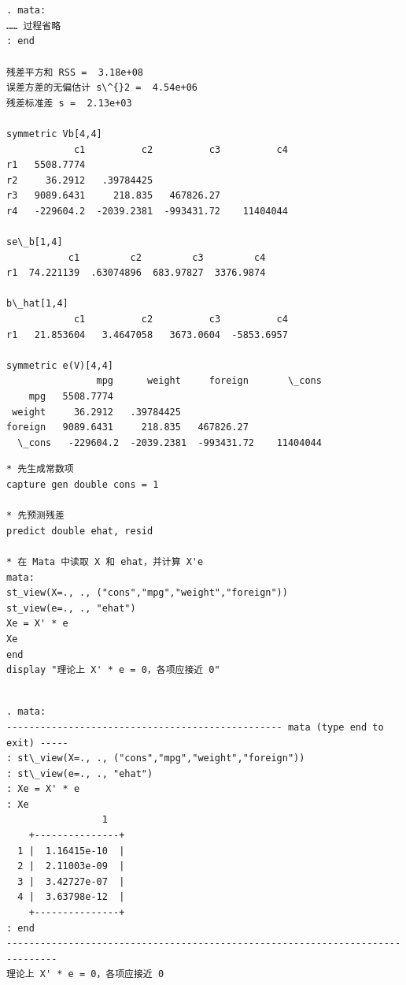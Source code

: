 \begin{tcolorbox}[title=在 Stata 的 Mata 中计算残差、SSR、$s^2$ 与协方差矩阵、标准误, colback=white, colframe=black, colbacktitle=white, coltitle=black,fonttitle=\bfseries]
	\vspace{-2em}

	\begin{Verbatim}[commandchars=\\\{\},xleftmargin=2em]


. mata:
…… 过程省略
: end

残差平方和 RSS =  3.18e+08
误差方差的无偏估计 s\^{}2 =  4.54e+06
残差标准差 s =  2.13e+03

symmetric Vb[4,4]
            c1          c2          c3          c4
r1   5508.7774
r2     36.2912   .39784425
r3   9089.6431     218.835   467826.27
r4   -229604.2  -2039.2381  -993431.72    11404044

se\_b[1,4]
           c1         c2         c3         c4
r1  74.221139  .63074896  683.97827  3376.9874

b\_hat[1,4]
            c1          c2          c3          c4
r1   21.853604   3.4647058   3673.0604  -5853.6957

symmetric e(V)[4,4]
                mpg      weight     foreign       \_cons
    mpg   5508.7774
 weight     36.2912   .39784425
foreign   9089.6431     218.835   467826.27
  \_cons   -229604.2  -2039.2381  -993431.72    11404044
	\end{Verbatim}

\end{tcolorbox}

\begin{tcolorbox}[title=在 Stata 的 Mata 中验证（残差与解释变量正交）, colback=white, colframe=black, colbacktitle=white, coltitle=black, fonttitle=\bfseries]
	\begin{lstlisting}[xleftmargin=2em, commentstyle=\color{black}]
* 先生成常数项
capture gen double cons = 1

* 先预测残差
predict double ehat, resid

* 在 Mata 中读取 X 和 ehat，并计算 X'e
mata:
st_view(X=., ., ("cons","mpg","weight","foreign"))
st_view(e=., ., "ehat")
Xe = X' * e
Xe
end
display "理论上 X' * e = 0，各项应接近 0"
	\end{lstlisting}
	\vspace{-2em}
	\begin{Verbatim}[commandchars=\\\{\},xleftmargin=2em]

. mata:
------------------------------------------------- mata (type end to exit) -----
: st\_view(X=., ., ("cons","mpg","weight","foreign"))
: st\_view(e=., ., "ehat")
: Xe = X' * e
: Xe
                 1
    +---------------+
  1 |  1.16415e-10  |
  2 |  2.11003e-09  |
  3 |  3.42727e-07  |
  4 |  3.63798e-12  |
    +---------------+
: end
-------------------------------------------------------------------------------
理论上 X' * e = 0，各项应接近 0
	\end{Verbatim}

\end{tcolorbox}

